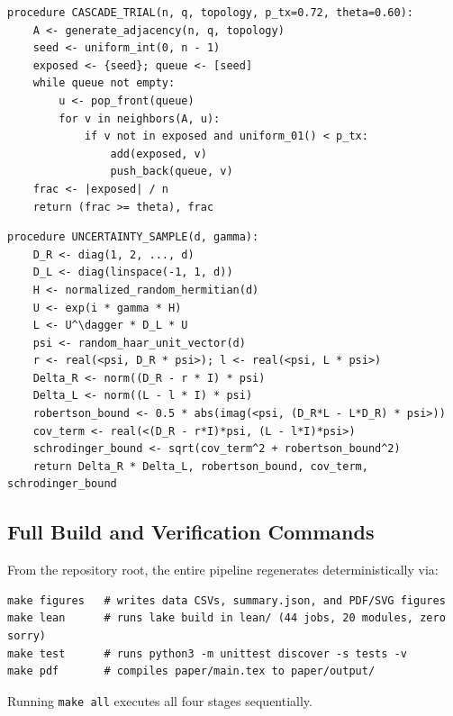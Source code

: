 \begin{lstlisting}[caption={Pseudocode for social-graph cascade percolation trials (Seed \texttt{202603}).},label={lst:cascade-algo}]
procedure CASCADE_TRIAL(n, q, topology, p_tx=0.72, theta=0.60):
    A <- generate_adjacency(n, q, topology)
    seed <- uniform_int(0, n - 1)
    exposed <- {seed}; queue <- [seed]
    while queue not empty:
        u <- pop_front(queue)
        for v in neighbors(A, u):
            if v not in exposed and uniform_01() < p_tx:
                add(exposed, v)
                push_back(queue, v)
    frac <- |exposed| / n
    return (frac >= theta), frac
\end{lstlisting}

\begin{lstlisting}[caption={Pseudocode for Hermitian unitary-rotation uncertainty sweep (Seed \texttt{202604}).},label={lst:uncertainty-algo}]
procedure UNCERTAINTY_SAMPLE(d, gamma):
    D_R <- diag(1, 2, ..., d)
    D_L <- diag(linspace(-1, 1, d))
    H <- normalized_random_hermitian(d)
    U <- exp(i * gamma * H)
    L <- U^\dagger * D_L * U
    psi <- random_haar_unit_vector(d)
    r <- real(<psi, D_R * psi>); l <- real(<psi, L * psi>)
    Delta_R <- norm((D_R - r * I) * psi)
    Delta_L <- norm((L - l * I) * psi)
    robertson_bound <- 0.5 * abs(imag(<psi, (D_R*L - L*D_R) * psi>))
    cov_term <- real(<(D_R - r*I)*psi, (L - l*I)*psi>)
    schrodinger_bound <- sqrt(cov_term^2 + robertson_bound^2)
    return Delta_R * Delta_L, robertson_bound, cov_term, schrodinger_bound
\end{lstlisting}

\subsection{Full Build and Verification Commands}
\label{app:rep-commands}

From the repository root, the entire pipeline regenerates deterministically via:
\begin{lstlisting}
make figures   # writes data CSVs, summary.json, and PDF/SVG figures
make lean      # runs lake build in lean/ (44 jobs, 20 modules, zero sorry)
make test      # runs python3 -m unittest discover -s tests -v
make pdf       # compiles paper/main.tex to paper/output/
\end{lstlisting}
Running \texttt{make all} executes all four stages sequentially.
